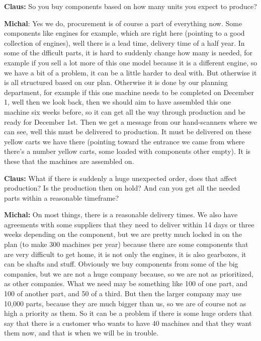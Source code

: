 \textbf{Claus:} So you buy components based on how many units you expect to
produce?\nl

\textbf{Michal}: Yes we do, procurement is of course a part of everything now.
Some components like engines for example, which are right here (pointing to a
good collection of engines), well there is a lead time, delivery time of a half
year.
In some of the dfficult parts, it is hard to suddenly change how many is needed,
for example if you sell a lot more of this one model because it is a different
engine, so we have a bit of a problem, it can be a little harder to deal with.
But otherwise it is all structured based on our plan. Otherwise it is done by
our planning department, for example if this one machine needs to be completed on
December 1, well then we look back, then we should aim to have assembled this
one machine six weeks before, so it can get all the way through production and
be ready for December 1st. Then we get a message from our hand-scanners where we
can see, well this must be delivered to production. It must be delivered on
these yellow carts we have there (pointing toward the entrance we came from
where there’s a number yellow carts, some loaded with components other empty).
It is these that the machines are assembled on.\nl

\textbf{Claus:} What if there is suddenly a huge unexpected order, does that
affect production? Is the production then on hold? And can you get all the
needed parts within a reasonable timeframe?\nl

\textbf{Michal:} On most things, there is a reasonable delivery times. We also
have agreements with some suppliers that they need to deliver within 14 days or
three weeks depending on the component, but we are pretty much locked in on the
plan (to make 300 machines per year) because there are some components that are
very difficult to get home, it is not only the engines, it is also gearboxes, it
can be shafts and stuff. Obviously we buy components from some of the big
companies, but we are not a huge company because, so we are not as prioritized,
as other companies. What we need may be something like 100 of one part, and 100
of another part, and 50 of a third. But then the larger company may use 10,000
parts, because they are much bigger than us, so we are of course not as high a
priority as them. So it can be a problem if there is some huge orders that say
that there is a customer who wants to have 40 machines and that they want them
now, and that is when we will be in trouble.\nl

